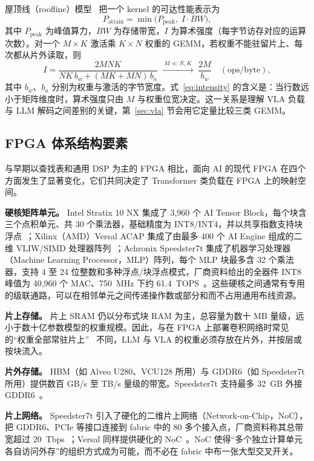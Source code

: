 \documentclass[a4paper,10.5pt]{ctexart}
\begin{document}
屋顶线（roofline）模型~\cite{roofline} 把一个 kernel 的可达性能表示为
\begin{equation}
  P_{\text{attain}} = \min\bigl(P_{\text{peak}},\; I\cdot BW\bigr),
  \label{eq:roofline}
\end{equation}
其中 $P_{\text{peak}}$ 为峰值算力，$BW$ 为存储带宽，$I$ 为算术强度（每字节访存对应的运算次数）。对一个 $M\times K$ 激活乘 $K\times N$ 权重的 GEMM，若权重不能驻留片上、每次都从片外读取，则
\begin{equation}
  I=\frac{2MNK}{NK\,b_w+(MK+MN)\,b_a}\;\xrightarrow{\;M\ll N,K\;}\;\frac{2M}{b_w}\quad(\text{ops/byte}),
  \label{eq:intensity}
\end{equation}
其中 $b_w$、$b_a$ 分别为权重与激活的字节宽度。式~\eqref{eq:intensity} 的含义是：当行数远小于矩阵维度时，算术强度只由 $M$ 与权重位宽决定。这一关系是理解 VLA 负载与 LLM 解码之间差别的关键，第~\ref{sec:vla} 节会用它定量比较三类 GEMM。

\subsection{FPGA 体系结构要素}

与早期以查找表和通用 DSP 为主的 FPGA 相比，面向 AI 的现代 FPGA 在四个方面发生了显著变化，它们共同决定了 Transformer 类负载在 FPGA 上的映射空间。

\textbf{硬核矩阵单元。} Intel Stratix 10 NX 集成了 3,960 个 AI Tensor Block，每个块含三个点积单元、共 30 个乘法器，基础精度为 INT8/INT4，并以共享指数支持块浮点~\cite{s10nx_fpga21,s10nx_trets}；Xilinx（AMD）Versal ACAP 集成了由最多 400 个 AI Engine 组成的二维 VLIW/SIMD 处理器阵列~\cite{versal_fpga19}；Achronix Speedster7t 集成了机器学习处理器（Machine Learning Processor，MLP）阵列，每个 MLP 块最多含 32 个乘法器，支持 4 至 24 位整数和多种浮点/块浮点模式，厂商资料给出的全器件 INT8 峰值为 40,960 个 MAC、750~MHz 下约 61.4~TOPS~\cite{achronix}。这些硬核之间通常有专用的级联通路，可以在相邻单元之间传递操作数或部分和而不占用通用布线资源。

\textbf{片上存储。} 片上 SRAM 仍以分布式块 RAM 为主，总容量为数十 MB 量级，远小于数十亿参数模型的权重规模。因此，与在 FPGA 上部署卷积网络时常见的“权重全部常驻片上”~\cite{finn,hls4ml} 不同，LLM 与 VLA 的权重必须存放在片外，并按层或按块流入。

\textbf{片外存储。} HBM（如 Alveo U280、VCU128 所用）与 GDDR6（如 Speedster7t 所用）提供数百 GB/s 至 TB/s 量级的带宽。Speedster7t 支持最多 32~GB 外接 GDDR6~\cite{achronix}。

\textbf{片上网络。} Speedster7t 引入了硬化的二维片上网络（Network-on-Chip，NoC），把 GDDR6、PCIe 等接口连接到 fabric 中的 80 多个接入点，厂商资料称其总带宽超过 20~Tbps~\cite{achronix}；Versal 同样提供硬化的 NoC~\cite{versal_fpga19}。NoC 使得“多个独立计算单元各自访问外存”的组织方式成为可能，而不必在 fabric 中布一张大型交叉开关。
\end{document}
